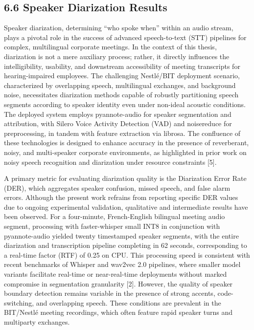 \documentclass[12pt,a4paper]{article}
\begin{document}
\subsection{6.6 Speaker Diarization Results}


Speaker diarization, determining “who spoke when” within an audio stream, plays a pivotal role in the success of advanced speech-to-text (STT) pipelines for complex, multilingual corporate meetings. In the context of this thesis, diarization is not a mere auxiliary process; rather, it directly influences the intelligibility, usability, and downstream accessibility of meeting transcripts for hearing-impaired employees. The challenging Nestlé/BIT deployment scenario, characterized by overlapping speech, multilingual exchanges, and background noise, necessitates diarization methods capable of robustly partitioning speech segments according to speaker identity even under non-ideal acoustic conditions. The deployed system employs pyannote-audio for speaker segmentation and attribution, with Silero Voice Activity Detection (VAD) and noisereduce for preprocessing, in tandem with feature extraction via librosa. The confluence of these technologies is designed to enhance accuracy in the presence of reverberant, noisy, and multi-speaker corporate environments, as highlighted in prior work on noisy speech recognition and diarization under resource constraints [5].


A primary metric for evaluating diarization quality is the Diarization Error Rate (DER), which aggregates speaker confusion, missed speech, and false alarm errors. Although the present work refrains from reporting specific DER values due to ongoing experimental validation, qualitative and intermediate results have been observed. For a four-minute, French-English bilingual meeting audio segment, processing with faster-whisper small INT8 in conjunction with pyannote-audio yielded twenty timestamped speaker segments, with the entire diarization and transcription pipeline completing in 62 seconds, corresponding to a real-time factor (RTF) of 0.25 on CPU. This processing speed is consistent with recent benchmarks of Whisper and wav2vec 2.0 pipelines, where smaller model variants facilitate real-time or near-real-time deployments without marked compromise in segmentation granularity [2]. However, the quality of speaker boundary detection remains variable in the presence of strong accents, code-switching, and overlapping speech. These conditions are prevalent in the BIT/Nestlé meeting recordings, which often feature rapid speaker turns and multiparty exchanges.
\end{document}
